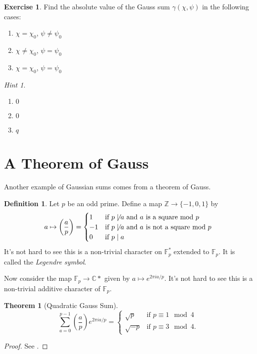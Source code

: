 \documentclass[11pt]{article}
\newcommand{\BB}[1]{\mathbb{#1}} %
\newcommand{\CC}{\BB{C}}
\newcommand{\ZZ}{\BB{Z}}
\newcommand{\FF}{\BB{F}}
\theoremstyle{plain}
\newtheorem{thm}[theoremCounter]{Theorem}
\theoremstyle{definition}
\newtheorem{defn}[definitionCounter]{Definition}
\newtheorem{excer}[exerciseCounter]{Exercise}
\theoremstyle{remark}
\newtheorem*{hint}{Hint}
\begin{document}
\begin{excer}
	Find the absolute value of the Gauss sum $\gamma(\chi,\psi)$ in the following cases:
	\begin{enumerate}[label=$\bullet$]
		\item $\chi = \chi_0$, $\psi \neq \psi_0$
		\item $\chi \neq \chi_0$, $\psi = \psi_0$
		\item $\chi = \chi_0$, $\psi = \psi_0$
	\end{enumerate}
	\begin{hint}
		\hfill
		\begin{enumerate}[label=$\bullet$]
			\item $0$
			\item $0$
			\item $q$
		\end{enumerate}
	\end{hint}
\end{excer}

\section{A Theorem of Gauss}

Another example of Gaussian sums comes from a theorem of Gauss.

\begin{defn}
	Let $p$ be an odd prime. Define a map $\ZZ \to \{-1,0,1\}$ by
	$$
	a \mapsto \left(\frac{a}{p}\right) =
	\begin{cases}
		1  &\text{if $p\not\mid a$ and $a$ is a square mod $p$}
		\\
		-1 &\text{if $p\not\mid a$ and $a$ is not a square mod $p$}
		\\
		0  &\text{if $p\mid a$}
	\end{cases}
	$$
	It's not hard to see this is a non-trivial character on $\FF_p^*$ extended to $\FF_p$. It is called the \emph{Legendre symbol}.
\end{defn}

Now consider the map $\FF_p \to \CC*$ given by $a\mapsto e^{2\pi i a / p}$. It's not hard to see this is a non-trivial additive character of $\FF_p$.

\begin{thm}[Quadratic Gauss Sum]\label{thm:gausssumreciprocity}
	$$
	\sum_{a=0}^{p-1} \left(\frac{a}{p}\right)e^{2\pi i a/p}
	=
	\begin{cases}
		\sqrt{p} &\text{if $p\equiv 1\mod{4}$}
		\\
		\sqrt{-p} &\text{if $p\equiv 3\mod{4}$}.
	\end{cases}
	$$
\end{thm}
\begin{proof}
	See \cite[Ch. 6]{ireland2013classical}.
\end{proof}
\end{document}
